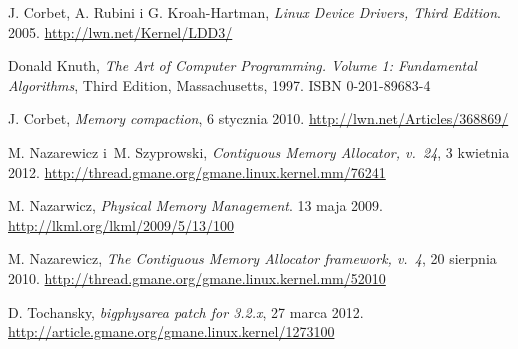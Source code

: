 \begin{thebibliography}{9}

  J. Corbet, A. Rubini i G. Kroah-Hartman,
  \emph{Linux Device Drivers, Third Edition}.
  2005.
  \url{http://lwn.net/Kernel/LDD3/}

  Donald Knuth,
  \emph{The Art of Computer Programming. Volume 1: Fundamental
    Algorithms},
  Third Edition,
  Massachusetts, 1997.
  ISBN 0-201-89683-4

  J. Corbet,
  \emph{Memory compaction},
  6 stycznia 2010.
  \url{http://lwn.net/Articles/368869/}

  M. Nazarewicz i~M. Szyprowski,
  \emph{Contiguous Memory Allocator, v.\ 24},
  3 kwietnia 2012.
  \url{http://thread.gmane.org/gmane.linux.kernel.mm/76241}

  M. Nazarwicz,
  \emph{Physical Memory Management}.
  13 maja 2009.
  \url{http://lkml.org/lkml/2009/5/13/100}

  M. Nazarewicz,
  \emph{The Contiguous Memory Allocator framework, v.\ 4},
  20 sierpnia 2010.
  \url{http://thread.gmane.org/gmane.linux.kernel.mm/52010}

  D. Tochansky,
  \emph{bigphysarea patch for 3.2.x},
  27 marca 2012.
  \url{http://article.gmane.org/gmane.linux.kernel/1273100}


\end{thebibliography}
